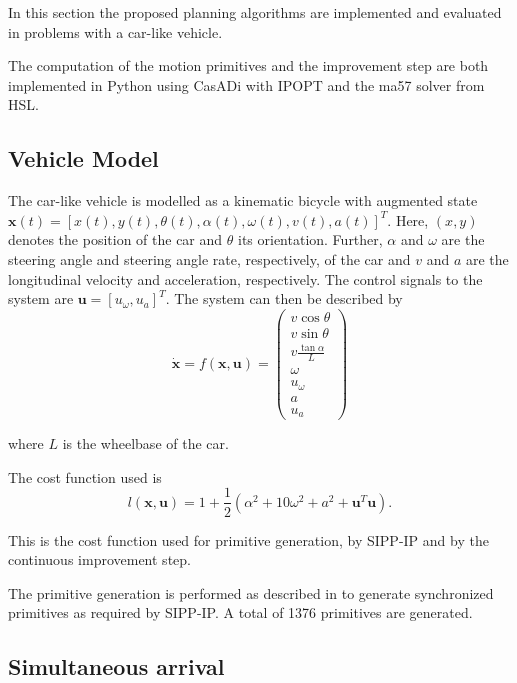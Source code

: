 \documentclass[letterpaper, 10 pt, conference]{ieeeconf}  %
\begin{document}
In this section the proposed planning algorithms are implemented and evaluated in problems with a car-like vehicle. 

The computation of the motion primitives and the improvement step are both implemented in Python using CasADi \cite{andersson2019casadi} with IPOPT \cite{wachter2006implementation} and the ma57 solver from HSL.

\subsection{Vehicle Model}

The car-like vehicle is modelled as a kinematic bicycle \cite{lavalle2006planning} with augmented state $\mathbf{x}(t) = [x(t), y(t), \theta(t), \alpha(t), \omega(t), v(t), a(t)]^T$. Here, $(x, y)$ denotes the position of the car and $\theta$ its orientation. Further, $\alpha$ and $\omega$ are the steering angle and steering angle rate, respectively, of the car and $v$ and $a$ are the longitudinal velocity and acceleration, respectively. The control signals to the system are $\mathbf{u} = [u_\omega, u_a]^T$. The system can then be described by
\begin{equation}
\dot{\mathbf{x}} = f(\mathbf{x}, \mathbf{u}) = 
\begin{pmatrix}
v \cos{\theta} \\
v \sin{\theta} \\
v \frac{\tan{\alpha}}{L} \\
\omega \\
u_\omega \\
a \\
u_a
\end{pmatrix}
\end{equation}

\noindent where $L$ is the wheelbase of the car.

The cost function used is 
\begin{equation}
l(\mathbf{x}, \mathbf{u}) = 1 + \frac{1}{2}(\alpha^2 + 10 \omega^2 + a^2 + \mathbf{u}^T \mathbf{u}).
\end{equation}

\noindent This is the cost function used for primitive generation, by SIPP-IP and by the continuous improvement step. 

The primitive generation is performed as described in \cite{hellander2026optimized} to generate synchronized primitives as required by SIPP-IP. A total of 1376 primitives are generated.

\subsection{Simultaneous arrival}
\end{document}
